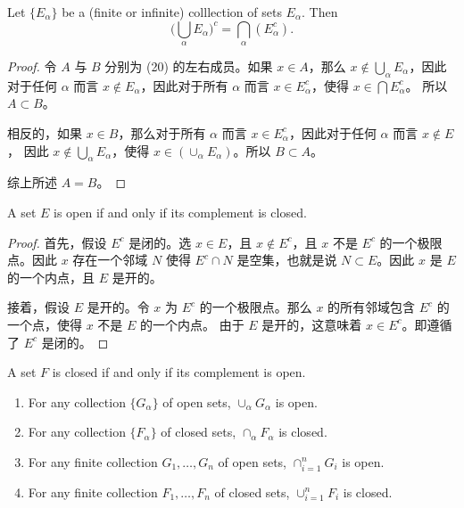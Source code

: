 \documentclass[../poma-notes.tex]{subfiles}
\begin{document}
\begin{theorem}
  Let $\{E_{\alpha}\}$ be a (finite or infinite) colllection of sets $E_{\alpha}$. Then
  \begin{equation}
    \biggl(\bigcup\limits_{\alpha} E_{\alpha}\biggr)^c = \bigcap\limits_{\alpha} (E_{\alpha}^c).
  \end{equation}
\end{theorem}

\begin{proof}
  令 $A$ 与 $B$ 分别为 (20) 的左右成员。如果 $x \in A$，那么 $x \notin \bigcup_{\alpha}E_{\alpha}$，因此对于任何 $\alpha$
  而言 $x \notin E_{\alpha}$，因此对于所有 $\alpha$ 而言 $x \in E_{\alpha}^c$，使得 $x \in \bigcap E_{\alpha}^c$。
  所以 $A \subset B$。

  相反的，如果 $x \in B$，那么对于所有 $\alpha$ 而言 $x \in E_{\alpha}^c$，因此对于任何 $\alpha$ 而言 $x \notin E$，
  因此 $x \notin \bigcup_{\alpha} E_{\alpha}$，使得 $x \in (\cup_{\alpha} E_{\alpha})$。所以 $B \subset A$。

  综上所述 $A = B$。
\end{proof}

\begin{theorem}
  A set $E$ is open if and only if its complement is closed.
\end{theorem}

\begin{proof}
  首先，假设 $E^c$ 是闭的。选 $x \in E$，且 $x \notin E^c$，且 $x$ 不是 $E^c$ 的一个极限点。因此 $x$ 存在一个邻域 $N$ 使得
  $E^c \cap N$ 是空集，也就是说 $N \subset E$。因此 $x$ 是 $E$ 的一个内点，且 $E$ 是开的。

  接着，假设 $E$ 是开的。令 $x$ 为 $E^c$ 的一个极限点。那么 $x$ 的所有邻域包含 $E^c$ 的一个点，使得 $x$ 不是 $E$ 的一个内点。
  由于 $E$ 是开的，这意味着 $x \in E^c$。即遵循了 $E^c$ 是闭的。
\end{proof}

\begin{corollary}
  A set $F$ is closed if and only if its complement is open.
\end{corollary}

\begin{theorem}\mbox{}
  \begin{enumerate}[label=(\alph*)]
    \item For any collection $\{G_{\alpha}\}$ of open sets, $\cup_{\alpha}G_{\alpha}$ is open.
    \item For any collection $\{F_{\alpha}\}$ of closed sets, $\cap_{\alpha}F_{\alpha}$ is closed.
    \item For any finite collection $G_1,\dots,G_n$ of open sets, $\cap_{i=1}^n G_i$ is open.
    \item For any finite collection $F_1,\dots,F_n$ of closed sets, $\cup_{i=1}^n F_i$ is closed.
  \end{enumerate}
\end{theorem}
\end{document}
